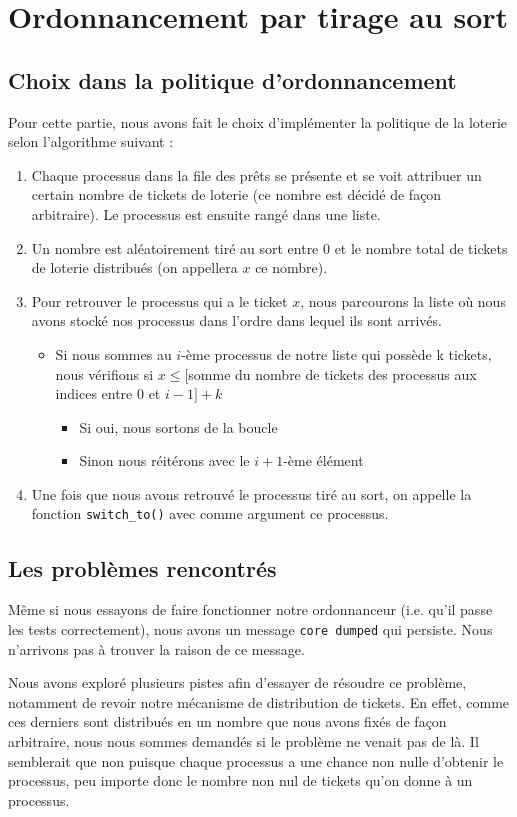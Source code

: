 \section{Ordonnancement par tirage au sort}

\subsection{Choix dans la politique d'ordonnancement}

Pour cette partie, nous avons fait le choix d'implémenter la politique de la loterie selon l'algorithme suivant : 
\\

\begin{enumerate}
	\item Chaque processus dans la file des prêts se présente et se voit attribuer un certain nombre de tickets de loterie (ce nombre est décidé de façon arbitraire). Le processus est ensuite rangé dans une liste.
	\item Un nombre est aléatoirement tiré au sort entre 0 et le nombre total de tickets de loterie distribués (on appellera $x$ ce nombre).
	\item Pour retrouver le processus qui a le ticket $x$, nous parcourons la liste où nous avons stocké nos processus dans l'ordre dans lequel ils sont arrivés.
		\begin{itemize}
			\item Si nous sommes au $i$-ème processus de notre liste qui possède k tickets, nous vérifions si $x \le [$somme du nombre de tickets des processus aux indices entre 0 et $i-1] + k$
				\begin{itemize}
					\item Si oui, nous sortons de la boucle
					\item Sinon nous réitérons avec le $i+1$-ème élément
				\end{itemize}
		\end{itemize}
	\item  Une fois que nous avons retrouvé le processus tiré au sort, on appelle la fonction \texttt{switch\_to()} avec comme argument ce processus. 
\end{enumerate}

\subsection{Les problèmes rencontrés}

Même si nous essayons de faire fonctionner notre ordonnanceur (i.e. qu'il passe les tests correctement), nous avons un message \texttt{core dumped} qui persiste. 
Nous n'arrivons pas à trouver la raison de ce message. 

Nous avons exploré plusieurs pistes afin d'essayer de résoudre ce problème, notamment de revoir notre mécanisme de distribution de tickets. 
En effet, comme ces derniers sont distribués en un nombre que nous avons fixés de façon arbitraire, nous nous sommes demandés si le problème ne venait pas de là. 
Il semblerait que non puisque chaque processus a une chance non nulle d'obtenir le processus, peu importe donc le nombre non nul de tickets qu'on donne à un processus.

